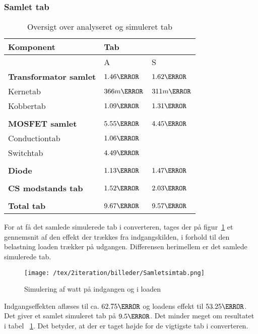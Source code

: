 \subsubsection{Samlet tab}
\begin{table}[H] 			
	\centering
	\begin{tabularx}{\textwidth}{|X|l|l|}
		\hline
		\textbf{\large Komponent} & \multicolumn{2}{|l|}{\textbf{\large Tab}} \\ \hline
		& A & S	\\ \hline
		\textbf{Transformator samlet} & $1.46\watt$ & $1.62\watt$ \\ \hline 
		Kernetab & $366m\watt$ & $311m\watt$ \\ \hline
		Kobbertab & $1.09\watt$ & $1.31\watt$ \\ \hline
		& &	\\ \hline
		\textbf{MOSFET samlet} & $5.55\watt$ & $4.45\watt$ \\ \hline
		Conductiontab & $1.06\watt$ & \\ \hline
		Switchtab & $4.49\watt$ & \\ \hline
		& &	\\ \hline
		\textbf{Diode} & $1.13\watt$ & $1.47\watt$ \\ \hline
		& &	\\ \hline
		\textbf{CS modstands tab} & $1.52\watt$ & $2.03\watt$ \\ \hline
		& &	\\ \hline
		\textbf{Total tab} & $9.67\watt$ & $9.57\watt$ \\ \hline
	\end{tabularx}
	\caption{Oversigt over analyseret og simuleret tab}
	\label{tab:anasim}
\end{table}

For at få det samlede simulerede tab i converteren, tages der på figur~\ref{fig: samletsimtab} et gennemsnit af den effekt der trækkes fra indgangskilden, i forhold til den belastning loaden trækker på udgangen. Differensen herimellem er det samlede simulerede tab.
\begin{figure}[H]
 	\center
 	\texttt{[image: /tex/2iteration/billeder/Samletsimtab.png]}
 	\caption{Simulering af watt på indgangen og i loaden}
 	\label{fig: samletsimtab}
\end{figure}

Indgangseffekten aflæses til ca. $62.75\watt$ og loadens effekt til $53.25\watt$. Det giver et samlet simuleret tab på $9.5\watt$. Det minder meget om resultatet i tabel ~\ref{tab:anasim}. Det betyder, at der er taget højde for de vigtigste tab i converteren. 

